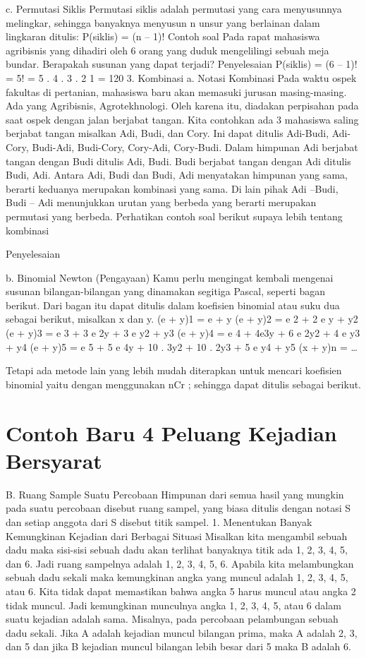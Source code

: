 \documentclass[11pt,fleqn]{book} %
\begin{document}
{{c. Permutasi Siklis
Permutasi siklis adalah permutasi yang cara menyusunnya melingkar, sehingga
banyaknya menyusun n unsur yang berlainan dalam lingkaran ditulis:
P(siklis) = (n – 1)!
Contoh soal
Pada rapat mahasiswa agribisnis yang dihadiri oleh 6 orang yang duduk mengelilingi
sebuah meja bundar. Berapakah susunan yang dapat terjadi?
Penyelesaian
P(siklis) = (6 – 1)! = 5! = 5 . 4 . 3 . 2  1 = 120
3. Kombinasi
a. Notasi Kombinasi
Pada waktu ospek fakultas di pertanian, mahasiswa baru akan memasuki jurusan masing-masing. Ada yang Agribisnis, Agrotekhnologi. Oleh karena itu, diadakan perpisahan pada saat ospek dengan jalan berjabat tangan. Kita contohkan ada 3 mahasiswa saling berjabat tangan misalkan Adi, Budi, dan Cory. Ini dapat ditulis Adi-Budi, Adi-Cory, Budi-Adi, Budi-Cory, Cory-Adi, Cory-Budi. Dalam himpunan Adi berjabat tangan dengan Budi ditulis {Adi, Budi}. Budi berjabat tangan dengan Adi ditulis {Budi, Adi}. Antara {Adi, Budi} dan {Budi, Adi} menyatakan himpunan yang sama, berarti keduanya merupakan kombinasi yang sama. Di lain pihak Adi –Budi, Budi – Adi menunjukkan urutan yang berbeda yang berarti merupakan permutasi yang berbeda.
Perhatikan contoh soal berikut supaya lebih tentang kombinasi


Penyelesaian

b. Binomial Newton (Pengayaan)
Kamu perlu mengingat kembali mengenai susunan bilangan-bilangan yang dinamakan
segitiga Pascal, seperti bagan berikut.
Dari bagan itu dapat ditulis dalam koefisien binomial atau suku dua sebagai berikut,
misalkan x dan y.
(e + y)1 = e + y
(e + y)2 = e 2 + 2 e y + y2
(e + y)3 = e 3 + 3 e 2y + 3 e y2 + y3
(e + y)4 = e 4 + 4e3y + 6 e 2y2 + 4 e y3 + y4
(e + y)5 = e 5 + 5 e 4y + 10 . 3y2 + 10 . 2y3 + 5 e y4 + y5
(x + y)n = …

Tetapi ada metode lain yang lebih mudah diterapkan untuk mencari koefisien binomial
yaitu dengan menggunakan nCr ; sehingga dapat ditulis sebagai berikut.


\section{Contoh Baru 4 Peluang Kejadian Bersyarat}

B. Ruang Sample Suatu Percobaan
Himpunan dari semua hasil yang mungkin pada suatu percobaan disebut ruang sampel, yang biasa ditulis dengan notasi S dan setiap anggota dari S disebut titik sampel.
1. Menentukan Banyak Kemungkinan Kejadian dari Berbagai Situasi
Misalkan kita mengambil sebuah dadu maka sisi-sisi sebuah dadu akan terlihat banyaknya titik ada 1, 2, 3, 4, 5, dan 6. Jadi ruang sampelnya adalah {1, 2, 3, 4, 5, 6}.
Apabila kita melambungkan sebuah dadu sekali maka kemungkinan angka yang muncul adalah 1, 2, 3, 4, 5, atau 6. Kita tidak dapat memastikan bahwa angka 5 harus muncul atau angka 2 tidak muncul.
Jadi kemungkinan munculnya angka 1, 2, 3, 4, 5, atau 6 dalam suatu kejadian adalah sama. Misalnya, pada percobaan pelambungan sebuah dadu sekali. Jika A adalah kejadian muncul bilangan prima, maka A adalah 2, 3, dan 5 dan jika B kejadian muncul bilangan lebih besar dari 5 maka B adalah 6.




}}
\end{document}
